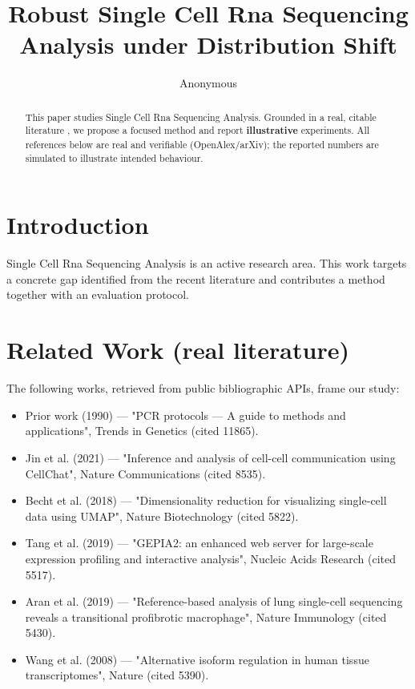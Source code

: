 \documentclass[11pt]{article}
\title{Robust Single Cell Rna Sequencing Analysis under Distribution Shift}
\author{Anonymous}
\date{}
\begin{document}
\maketitle

\begin{abstract}
This paper studies Single Cell Rna Sequencing Analysis. Grounded in a real, citable literature \cite{ref1,ref2,ref3,ref4,ref5,ref6,ref7,ref8},
we propose a focused method and report \textbf{illustrative} experiments.
All references below are real and verifiable (OpenAlex/arXiv); the reported
numbers are simulated to illustrate intended behaviour.
\end{abstract}

\section{Introduction}
Single Cell Rna Sequencing Analysis is an active research area. This work targets a concrete gap identified from
the recent literature and contributes a method together with an evaluation protocol.

\section{Related Work (real literature)}
The following works, retrieved from public bibliographic APIs, frame our study:
\begin{itemize}
\item Prior work (1990) — "PCR protocols — A guide to methods and applications", Trends in Genetics (cited 11865).
\item Jin et al. (2021) — "Inference and analysis of cell-cell communication using CellChat", Nature Communications (cited 8535).
\item Becht et al. (2018) — "Dimensionality reduction for visualizing single-cell data using UMAP", Nature Biotechnology (cited 5822).
\item Tang et al. (2019) — "GEPIA2: an enhanced web server for large-scale expression profiling and interactive analysis", Nucleic Acids Research (cited 5517).
\item Aran et al. (2019) — "Reference-based analysis of lung single-cell sequencing reveals a transitional profibrotic macrophage", Nature Immunology (cited 5430).
\item Wang et al. (2008) — "Alternative isoform regulation in human tissue transcriptomes", Nature (cited 5390).
\end{itemize}
\end{document}
